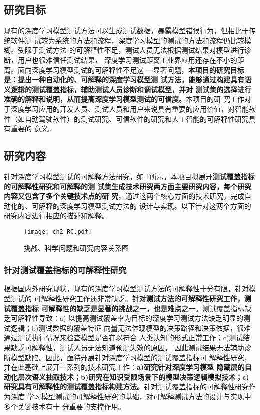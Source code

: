 \subsection{研究目标}\label{ch2target}

现有的深度学习模型测试方法可以生成测试数据，暴露模型错误行为，但相比于传统软件测
试较为系统的方法和流程，深度学习模型的测试的方法和流程仍比较模糊。受限于测试方法
的可解释性不足，测试人员无法根据测试结果对模型进行诊断，用户也很难信任测试结果，
深度学习测试距离工业界应用还存在不小的距离。面向深度学习模型测试的可解释性不足这
一显著问题，\textbf{本项目的研究目标是：提出一种自动化的、可解释的深度学习模型测
试方法，能够通过构建具有语义逻辑的测试覆盖指标，辅助测试人员诊断和调试模型，并对
测试集的选择进行准确的解释和说明，从而提高深度学习模型测试的可信度。}本项目的研
究工作对于深度学习应用的开发人员、测试人员和用户来说具有重要的应用价值，对智能软
件（如自动驾驶软件）的测试研究、可信软件的研究和人工智能的可解释性研究具有重要的
意义。

\subsection{研究内容}\label{ch2content}针对深度学习模型测试的可解释方法研究，如
\ref{fig:ch2:rc}所示，本项目拟展开\textbf{测试覆盖指标的可解释性研究和可解释的测
试集生成技术研究两方面主要研究内容，每个研究内容又包含了多个关键技术点的研
究}。通过这两个核心方面的技术研究，完成自动化的、可解释的深度学习模型测试方法的
设计与实现。以下针对这两个方面的研究内容进行相应的描述和解释。

\begin{figure}[htp]
    \begin{small}
        \begin{center}
            \texttt{[image: ch2\_RC.pdf]}
        \end{center}
        \caption{挑战、科学问题和研究内容关系图}
        \label{fig:ch2:rc}
    \end{small}
\end{figure}

\subsubsection{针对测试覆盖指标的可解释性研究}
根据国内外研究现状，现有的深度学习模型测试方法的可解释性十分有限，针对模型测试的
可解释性研究工作还非常缺乏。\textbf{针对测试方法的可解释性研究工作，测试覆盖指标
可解释性的缺乏是显著的挑战之一，也是难点之一}。测试覆盖指标缺乏可解释性导致：a)
以提高测试覆盖率为目标的深度学习测试方法缺乏明显的测试逻辑；b)测试数据的覆盖特征
向量无法体现模型的决策路径和决策依据，很难通过测试执行情况来检查模型是否在以符合
人类认知的形式正常工作；c)测试结果缺乏可解释性，测试人员无法知道预测失效的原因，
因此测试结果无法辅助诊断模型缺陷。因此，亟待开展针对深度学习模型的测试覆盖指标可
解释性研究，并在此基础上展开一系列的技术研究工作：\textbf{a)研究针对深度学习模型
隐藏层的自动化层次语义抽取技术；b)研究在知识受限场景下的模型决策逻辑模拟技术；c)
研究具有可解释性的测试覆盖指标构建方法。}针对测试覆盖指标的可解释性研究作为深度
学习模型测试的可解释性研究的基础，对可解释测试方法的设计与实现中多个关键技术有十
分重要的支撑作用。

